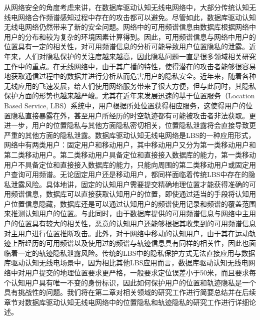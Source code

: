 从网络安全的角度考虑来讲，在数据库驱动认知无线电网络中，大部分传统认知无线电网络合作频谱感知过程中存在的攻击都可以避免。尽管如此，数据库驱动认知无线电网络仍然带来了新的安全问题。网络中的可用频谱信息由数据库根据网络中用户的分布和较为复杂的环境因素计算得到。因此，可用频谱信息与网络中用户的位置具有一定的相关性，对可用频谱信息的分析可能导致用户位置隐私的泄露。近年来，人们对隐私保护的关注度越来越高，因此隐私问题一直是很多领域相关研究工作中的重点。在无线网络中，由于其广播的特性，使得潜在的攻击者能够很容易地获取通信过程中的数据并进行分析从而危害用户的隐私安全。近年来，随着各种无线应用的飞速发展，给人们使用网络服务带来了很大方便，但与此同时，其隐私保护方面的形势也越来越严峻。尤其在近年来发展迅速的基于位置服务（Location Based Service, LBS）系统中，用户根据所处位置获得相应服务，这使得用户的位置隐私直接暴露在外，甚至用户所经历的时空轨迹都有可能被攻击者非法获取。更进一步，用户的位置隐私与其他方面隐私密切相关，位置隐私泄露将会直接导致更严重的其他方面的隐私泄露。数据库驱动认知无线电网络是LBS的一种应用形式，网络中有两类用户：固定用户和移动用户，其中移动用户又分为第一类移动用户和第二类移动用户。第二类移动用户具备定位和直接接入数据库的能力，第一类移动用户不具备定位和直接接入数据库的能力，只能向周围的第二类移动用户或固定用户查询可用频谱。无论固定用户还是移动用户，都同样面临着传统LBS中存在的隐私泄露风险。具体地讲，固定的认知用户需要提交精确地理位置才能获得准确的可用频谱信息，数据库可以直接获取认知用户的位置，即使通过适当的手段将认知用户位置信息隐藏\cite{gao2013location}，数据库还是可以通过认知用户的频谱使用记录和频谱的覆盖范围来推测认知用户的位置。与此同时，由于数据库提供的可用频谱信息与网络中主用户的位置具有较大的相关性，恶意的认知用户还能够根据其收集到的可用频谱信息对主用户进行位置推断攻击。此外，对于网络中移动的认知用户，由于其在运动轨迹上所经历的可用频谱以及使用过的频谱与轨迹信息具有同样的相关性，因此也面临着一定的轨迹隐私泄露风险。传统的LBS中的隐私保护方式无法直接应用与数据库驱动认知无线电场景中，因为相比其他LBS应用而言，数据库驱动认知无线电网络中对用户提交的地理位置要求更严格，一般要求定位误差小于50米，而且要求每个认知用户具有唯一不变的身份标识，因此如何保护用户的位置和轨迹隐私是一个具有挑战性的问题。我们将在第二章对相关领域的研究工作进行简要总结并在后续章节对数据库驱动认知无线电网络中的位置隐私和轨迹隐私的研究工作进行详细论述。




%



